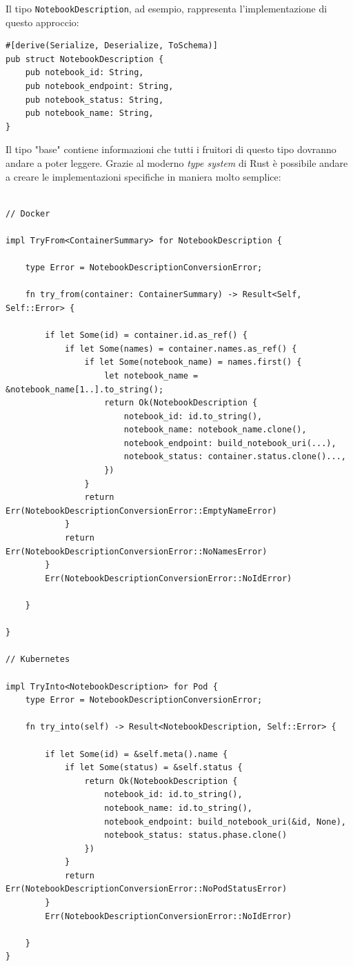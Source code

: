 Il tipo \verb|NotebookDescription|, ad esempio, rappresenta l'implementazione di questo approccio:
\begin{verbatim}
#[derive(Serialize, Deserialize, ToSchema)]
pub struct NotebookDescription {
    pub notebook_id: String,
    pub notebook_endpoint: String,
    pub notebook_status: String,
    pub notebook_name: String,
}
\end{verbatim}
Il tipo "base" contiene informazioni che tutti i fruitori di questo tipo dovranno andare a poter leggere.
\newline
Grazie al moderno \textit{type system} di Rust è possibile andare a creare le implementazioni specifiche in maniera molto semplice:
\begin{verbatim}

// Docker

impl TryFrom<ContainerSummary> for NotebookDescription {

    type Error = NotebookDescriptionConversionError;
    
    fn try_from(container: ContainerSummary) -> Result<Self, Self::Error> {

        if let Some(id) = container.id.as_ref() {
            if let Some(names) = container.names.as_ref() {
                if let Some(notebook_name) = names.first() {
                    let notebook_name = &notebook_name[1..].to_string();
                    return Ok(NotebookDescription { 
                        notebook_id: id.to_string(),
                        notebook_name: notebook_name.clone(),
                        notebook_endpoint: build_notebook_uri(...),
                        notebook_status: container.status.clone()...,
                    })
                }
                return Err(NotebookDescriptionConversionError::EmptyNameError)            
            }
            return Err(NotebookDescriptionConversionError::NoNamesError)
        }
        Err(NotebookDescriptionConversionError::NoIdError)

    }
    
} 

// Kubernetes

impl TryInto<NotebookDescription> for Pod {
    type Error = NotebookDescriptionConversionError;

    fn try_into(self) -> Result<NotebookDescription, Self::Error> {

        if let Some(id) = &self.meta().name {
            if let Some(status) = &self.status {
                return Ok(NotebookDescription {
                    notebook_id: id.to_string(),
                    notebook_name: id.to_string(),
                    notebook_endpoint: build_notebook_uri(&id, None),
                    notebook_status: status.phase.clone()
                })
            }
            return Err(NotebookDescriptionConversionError::NoPodStatusError)
        }
        Err(NotebookDescriptionConversionError::NoIdError)
        
    }
}
\end{verbatim}

